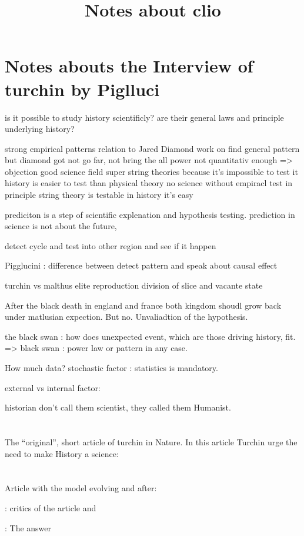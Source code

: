 \documentclass[a4paper]{article}
\title{Notes about clio}
\begin{document}
\section{Notes abouts the Interview of turchin by Piglluci}
	is it possible to study history scientificly?
	are their general laws and principle underlying history?

	strong empirical patterns relation to Jared Diamond work on find general pattern
but diamond got not go far, not bring the all power not quantitativ enough
=> objection good science field super string theories because it's impossible to test it
	history is easier to test than physical theory
	no science without empiracl test
	in principle string theory is testable
	in history it's easy
					
prediciton is a step of scientific explenation and hypothesis testing.
prediction in science is not about the future,

detect cycle and test into other region and see if it happen

Pigglucini : difference between detect pattern and speak about causal effect

turchin vs malthus
elite reproduction division of slice and vacante state


After the black death in england and france both kingdom shoudl grow back under matlusian expection. But no. Unvaliadtion of the hypothesis.

the black swan : how does unexpected event, which are those driving history, fit. => black swan : power law or pattern in any case.

How much data? stochastic factor : statistics is mandatory.

external vs internal factor:


historian don't call them scientist, they called them Humanist.

\section{\cite{turchin_arise_2008}}
The ``original'', short article of turchin in Nature. In this article Turchin urge the need to make History a science:


\section{\cite{turchin_war_2013}}

Article with the model evolving and after:

\cite{thomas_does_2014} : critics of the article and

\cite{turchin_reply_2014}: The answer



\end{document}
